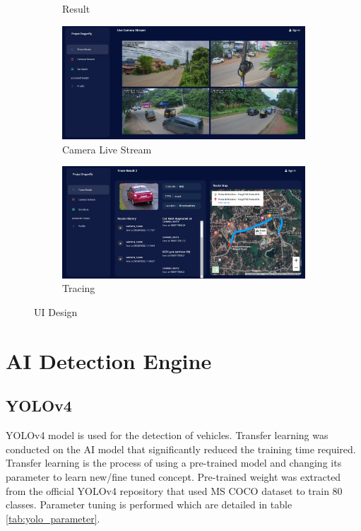 \begin{figure}[!ht]
\begin{subfigure}[b]{0.48\linewidth}
		\caption{Result}
		\label{fig:result1}
	\end{subfigure} \hfill
	\begin{subfigure}[b]{0.48\linewidth}
		\centering
		\includegraphics[width=\linewidth]{Images/UI/live_stream}
		\caption{Camera Live Stream}
		\label{fig:result2}
	\end{subfigure} \hfill
	\begin{subfigure}[b]{0.48\linewidth}
		\centering
		\includegraphics[width=\linewidth]{Images/UI/tracing}
		\caption{Tracing}
		\label{fig:tracing}
	\end{subfigure}
	\caption{UI Design}
\end{figure}

\section{AI Detection Engine}
\subsection{YOLOv4}
YOLOv4 model is used for the detection of vehicles. Transfer learning was conducted on the AI model that significantly reduced the training time required. Transfer learning is the process of using a pre-trained model and changing its parameter to learn new/fine tuned concept. Pre-trained weight was extracted from the official YOLOv4 repository \cite{darknet} that used MS COCO dataset to train 80 classes. Parameter tuning is performed which are detailed in table \ref{tab:yolo_parameter}.

